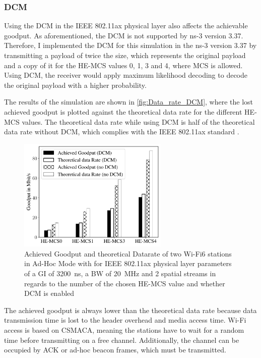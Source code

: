 \subsubsection*{\acf{DCM}}
Using the \ac{DCM} in the IEEE 802.11ax physical layer also affects the achievable goodput.
As aforementioned, the \ac{DCM} is not supported by ns-3 version 3.37.
Therefore, I implemented the \ac{DCM} for this simulation in the ns-3 version 3.37 by transmitting a payload of twice the size, which represents the original payload and a
copy of it for the \ac{HE}-\ac{MCS} values 0, 1, 3 and 4, where \ac{MCS} is allowed.
Using \ac{DCM}, the receiver would apply maximum likelihood decoding to decode the original payload with a higher probability.

The results of the simulation are shown in \autoref{fig:Data_rate_DCM}, where the lost achieved goodput is plotted against
the theoretical data rate for the different \ac{HE}-\ac{MCS} values.
The theoretical data rate while using \ac{DCM} is half of the
theoretical data rate without \ac{DCM}, which complies with the IEEE 802.11ax standard \cite{ieee_standard_2021ax}.
\begin{figure}[H]%
   \centering
   \includegraphics[width=0.64\textwidth]{figures/DCM_dataRate_simulation.pdf}
   \caption{Achieved Goodput and theoretical Datarate of two Wi-Fi6 stations in Ad-Hoc Mode with for IEEE 802.11ax physical layer parameters of a \acf{GI} of \SI{3200}{\nano\second}, a \acf{BW} of \SI{20}{\mega\hertz} and \num{2} spatial streams  in regards to the number of the chosen \ac{HE}-\acf{MCS} value and whether \acf{DCM} is enabled}%
   \label{fig:Data_rate_DCM}%
\end{figure}

The achieved goodput is always lower than the theoretical data rate because data transmission time is lost to the header overhead and media access time.
Wi-Fi access is based on \ac{CSMACA}, meaning the stations have to wait for a random time before transmitting on a free channel.
Additionally, the channel can be occupied by ACK or ad-hoc beacon frames, which must be transmitted.

